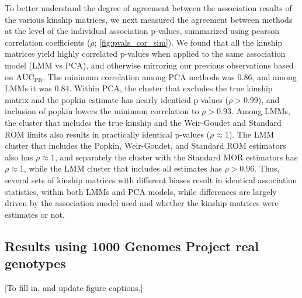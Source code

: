 \documentclass[11pt]{article}
\newcommand{\auc}{\text{AUC}_\text{PR}}
\begin{document}
To better understand the degree of agreement between the association results of the various kinship matrices, we next measured the agreement between methods at the level of the individual association p-values, summarized using pearson correlation coefficients ($\rho$; \cref{fig:pvals_cor_sim}).
We found that all the kinship matrices yield highly correlated p-values when applied to the same association model (LMM vs PCA), and otherwise mirroring our previous observations based on $\auc$.
The minimum correlation among PCA methods was $0.86$, and among LMMs it was $0.84$.
Within PCA, the cluster that excludes the true kinship matrix and the popkin estimate has nearly identical p-values ($\rho > 0.99$), and inclusion of popkin lowers the minimum correlation to $\rho > 0.93$.
Among LMMs, the cluster that includes the true kinship and the Weir-Goudet and Standard ROM limits also results in practically identical p-values ($\rho \approx 1$).
The LMM cluster that includes the Popkin, Weir-Goudet, and Standard ROM estimators also has $\rho \approx 1$, and separately the cluster with the Standard MOR estimators has $\rho \approx 1$, while the LMM cluster that includes all estimates has $\rho > 0.96$.
Thus, several sets of kinship matrices with different biases result in identical association statistics, within both LMMs and PCA models, while differences are largely driven by the association model used and whether the kinship matrices were estimates or not.

\subsection{Results using 1000 Genomes Project real genotypes}

[To fill in, and update figure captions.]



\graphicspath{ {../data/tgp-nygc-autosomes_ld_prune_1000kb_0.3_maf-0.01/} }
\end{document}
